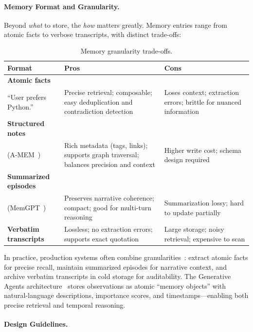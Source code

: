 \paragraph{Memory Format and Granularity.}
\label{memory-format-and-granularity.}

Beyond \emph{what} to store, the \emph{how} matters greatly. Memory entries range from atomic facts to verbose transcripts, with distinct trade-offs:

\begin{table}[ht!]
\centering
\caption{Memory granularity trade-offs.}
\begin{tabular}{@{}lp{5cm}p{8cm}@{}}
\toprule
\textbf{Format} & \textbf{Pros} & \textbf{Cons} \\
\midrule
\textbf{Atomic facts}\\

``User prefers Python.'' & Precise retrieval; composable; easy deduplication and contradiction detection & Loses context; extraction errors; brittle for nuanced information \\
\textbf{Structured notes}\\

(A-MEM~\cite{xu2025amem}) & Rich metadata (tags, links); supports graph traversal; balances precision and context & Higher write cost; schema design required \\
\textbf{Summarized episodes}\\

(MemGPT~\cite{packer2023memgpt}) & Preserves narrative coherence; compact; good for multi-turn reasoning & Summarization lossy; hard to update partially \\
\textbf{Verbatim transcripts} & Lossless; no extraction errors; supports exact quotation & Large storage; noisy retrieval; expensive to scan \\
\bottomrule
\end{tabular}
\end{table}

In practice, production systems often combine granularities~\cite{chhikara2025mem0}: extract atomic facts for precise recall, maintain summarized episodes for narrative context, and archive verbatim transcripts in cold storage for auditability. The Generative Agents architecture~\cite{park2023generative} stores observations as atomic ``memory objects'' with natural-language descriptions, importance scores, and timestamps---enabling both precise retrieval and temporal reasoning.

\paragraph{Design Guidelines.}
\label{design-guidelines.}

